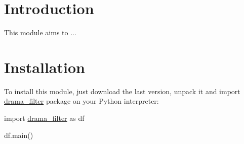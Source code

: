 \hypertarget{index_intro}{}\section{Introduction}\label{index_intro}
This module aims to ...\hypertarget{index_install_sec}{}\section{Installation}\label{index_install_sec}
To install this module, just download the last version, unpack it and import \hyperlink{namespacedrama__filter}{drama\_\-filter} package on your Python interpreter:

import \hyperlink{namespacedrama__filter}{drama\_\-filter} as df

df.main() 